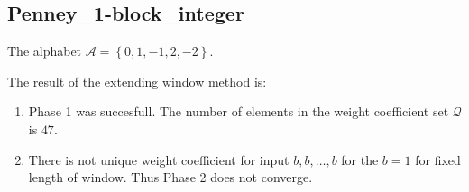 \subsection{ Penney\_1-block\_integer }

\label{subsec:Penney1-blockinteger}

The alphabet $\mathcal{A} =\left\{0, 1, -1, 2, -2\right\}$.

\noindent The result of the extending window method is:
\begin{enumerate}
    \item Phase 1 was succesfull.
The number of elements in the weight coefficient set $\mathcal{Q}$ is $47$.

    \item There is not unique weight coefficient for input $b,b,\dots,b$ for the $b= 1 $ for fixed length of window. Thus Phase 2 does not converge.

\end{enumerate}
